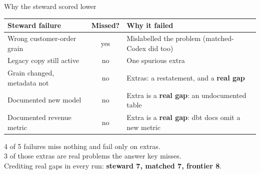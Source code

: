 \documentclass[aspectratio=169,11pt]{beamer}
\newcommand{\partlabel}{}
\newcommand{\setpart}[1]{\renewcommand{\partlabel}{#1}}
\begin{document}
\setpart{Part 3 \textbullet{} Results}
\begin{frame}{Why the steward scored lower}
  \small
  \begin{tabular}{@{}p{}cp{}@{}}
    \toprule
    Steward failure & Missed? & Why it failed \\
    \midrule
    Wrong customer-order grain & yes & Mislabelled the problem (matched-Codex did too) \\
    Legacy copy still active & no & One spurious extra \\
    Grain changed, metadata not & no & Extras: a restatement, and a \textbf{real gap} \\
    Documented new model & no & Extra is a \textbf{real gap}: an undocumented table \\
    Documented revenue metric & no & Extra is a \textbf{real gap}: dbt docs omit a new metric \\
    \bottomrule
  \end{tabular}
  \par\vspace{0.8em}
  \begin{keybox}
    4 of 5 failures miss nothing and fail only on extras.\\
    3 of those extras are real problems the answer key misses.\\
    Crediting real gaps in every run: \textbf{steward 7, matched 7, frontier 8}.
  \end{keybox}
\end{frame}
\end{document}
